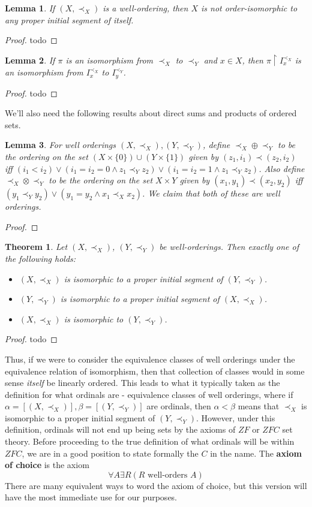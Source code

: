 \documentclass{article}
\theoremstyle{definition}
\theoremstyle{plain}
\theoremstyle{theorem}
\newtheorem{lemma}{Lemma}[section]
\newtheorem{theorem}{Theorem}[section]
\begin{document}
\begin{lemma}
	If $(X,\prec_X)$ is a well-ordering, then $X$ is not order-isomorphic to any proper initial segment of itself. 
\end{lemma}	
\begin{proof}
	todo
\end{proof}
\begin{lemma}
	If $\pi$ is an isomorphism from $\prec_X$ to $\prec_Y$ and $x \in X$, then $\pi\restriction I^{\prec_X}_x$ is an isomorphism from $I_x^{\prec_X}$ to $I_y^{\prec_Y}$.  
\end{lemma}
\begin{proof}
	todo
\end{proof}
We'll also need the following results about direct sums and products of ordered sets.
\begin{lemma}
	For well orderings $(X,\prec_X),(Y,\prec_Y)$, define $\prec_X \oplus \prec_Y$ to be the ordering on the set $(X \times \{0\}) \cup (Y \times \{1\})$ given by $(z_1,i_1) \prec (z_2,i_2)$ iff $(i_1 < i_2) \vee (i_1 = i_2 = 0 \wedge z_1 \prec_Y z_2) \vee (i_1 = i_2 = 1 \wedge z_1 \prec_Y z_2)$. Also define $\prec_X \otimes \prec_Y$ to be the ordering on the set $X \times Y$ given by $(x_1,y_1) \prec (x_2,y_2)$ iff $(y_1 \prec_Y y_2) \vee (y_1 = y_2 \wedge x_1 \prec_X x_2)$. We claim that both of these are well orderings.
\end{lemma}
\begin{proof}
\end{proof}
\begin{theorem}
	Let $(X,\prec_X)$, $(Y,\prec_Y)$ be well-orderings. Then exactly one of the following holds:
	\begin{itemize}
		\item[(1)] $(X,\prec_X)$ is isomorphic to a proper initial segment of $(Y,\prec_Y)$.
		\item[(2)] $(Y,\prec_Y)$ is isomorphic to a proper initial segment of $(X,\prec_X)$. 
		\item[(3)] $(X,\prec_X)$ is isomorphic to $(Y,\prec_Y)$. 
	\end{itemize}
\end{theorem}
\begin{proof}
todo
\end{proof}
Thus, if we were to consider the equivalence classes of well orderings under the equivalence relation of isomorphism, then that collection of classes would in some sense \textit{itself} be linearly ordered. This leads to what it typically taken as the definition for what ordinals are - equivalence classes of well orderings, where if $\alpha = [(X,\prec_X)],\beta = [(Y,\prec_Y)]$ are ordinals, then $\alpha < \beta$ means that $\prec_X$ is isomorphic to a proper initial segment of $(Y,\prec_Y)$. However, under this definition, ordinals will not end up being sets by the axioms of $ZF$ or $ZFC$ set theory.
Before proceeding to the true definition of what ordinals will be within $ZFC$, we are in a good position to state formally the $C$ in the name. The \textbf{axiom of choice} is the axiom
\[ \forall A \exists R (R \textrm{ well-orders }A) \]
There are many equivalent ways to word the axiom of choice, but this version will have the most immediate use for our purposes. 
\end{document}
